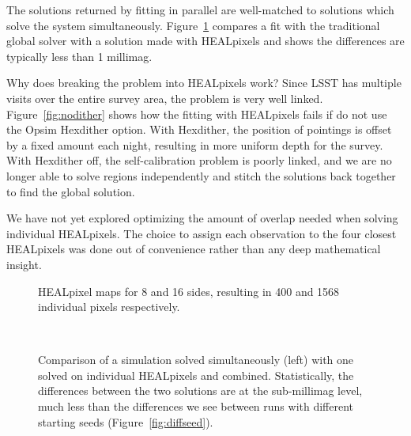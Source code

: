 \documentclass[12pt,preprint]{aastex}
\begin{document}
The solutions returned by fitting in parallel are well-matched to solutions which solve the system simultaneously.  Figure~\ref{fig:hpvglobal} compares a fit with the traditional global solver with a solution made with HEALpixels and shows the differences are typically less than 1 millimag.  





Why does breaking the problem into HEALpixels work?  Since LSST has multiple visits over the entire survey area, the problem is very well linked.  Figure~\ref{fig:nodither} shows how the fitting with HEALpixels fails if do not use the Opsim Hexdither option.  With Hexdither, the position of pointings is offset by a fixed amount each night, resulting in more uniform depth for the survey.  With Hexdither off, the self-calibration problem is poorly linked, and we are no longer able to solve regions independently and stitch the solutions back together to find the global solution.  

We have not yet explored optimizing the amount of overlap needed when solving individual HEALpixels.   The choice to assign each observation to the four closest HEALpixels was done out of convenience rather than any deep mathematical insight.  


\begin{figure}
\caption{HEALpixel maps for 8 and 16 sides, resulting in 400 and 1568 individual pixels respectively.}
\end{figure}


\begin{figure}
 \\
\caption{Comparison of a simulation solved simultaneously (left) with one solved on individual HEALpixels and combined.  Statistically, the differences between the two solutions are at the sub-millimag level, much less than the differences we see between runs with different starting seeds (Figure~\ref{fig:diffseed}). \label{fig:hpvglobal}}
\end{figure}
\end{document}
